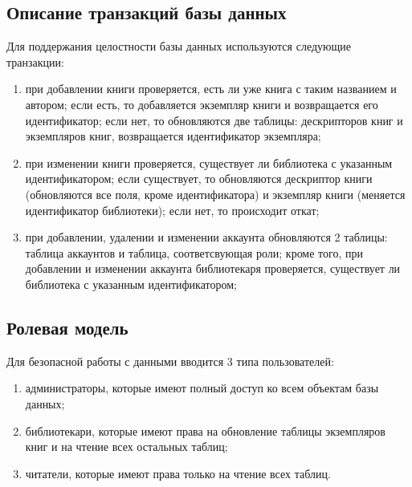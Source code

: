 \subsection{Описание транзакций базы данных}
Для поддержания целостности базы данных используются следующие \\транзакции:
\begin{enumerate}
    \item при добавлении книги проверяется, есть ли уже книга с таким названием и автором; если есть, то добавляется экземпляр книги и возвращается его идентификатор; если нет, то обновляются две таблицы: дескрипторов книг и экземпляров книг, возвращается идентификатор экземпляра;
    \item при изменении книги проверяется, существует ли библиотека с указанным идентификатором; если существует, то обновляются дескриптор книги (обновляются все поля, кроме идентификатора) и экземпляр книги (меняется идентификатор библиотеки);  если нет, то происходит откат;
    \item при добавлении, удалении и изменении аккаунта обновляются 2 таблицы: таблица аккаунтов и таблица, соответсвующая роли; кроме того, при добавлении и изменении аккаунта библиотекаря проверяется, существует ли библиотека с указанным идентификатором;
\end{enumerate}

\subsection{Ролевая модель}
Для безопасной работы с данными вводится 3 типа пользователей:
\begin{enumerate}
    \item администраторы, которые имеют полный доступ ко всем объектам базы данных;
    \item библиотекари, которые имеют права на обновление таблицы экземпляров книг и на чтение всех остальных таблиц;
    \item читатели, которые имеют права только на чтение всех таблиц.
\end{enumerate}

